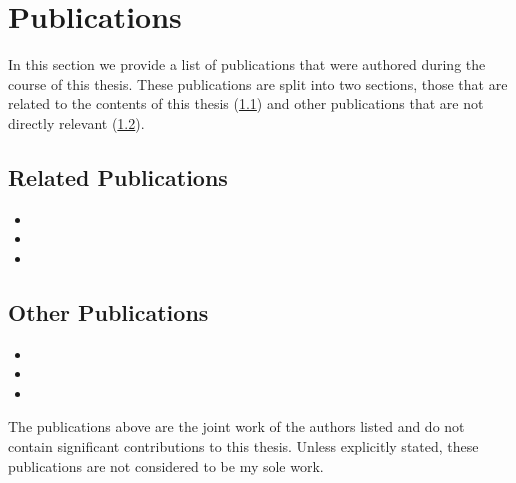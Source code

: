 \section{Publications}\label{sec:intro_pubs}
In this section we provide a list of publications that were authored during the
course of this thesis. These publications are split into two sections, those
that are related to the contents of this thesis 
(\cref{subsec:intro_rel_pubs}) and other publications that 
are not directly relevant (\cref{subsec:intro_other_pubs}).
\subsection{Related Publications}\label{subsec:intro_rel_pubs}
\begin{itemize}
	\item{}
	\item{}
	\item{}
\end{itemize}
\subsection{Other Publications}\label{subsec:intro_other_pubs}
\begin{itemize}
	\item{}
	\item{}
	\item{}
\end{itemize}
The publications above are the joint work of the authors listed and do not
contain significant contributions to this thesis. Unless explicitly stated,
these publications are not considered to be my sole work.

